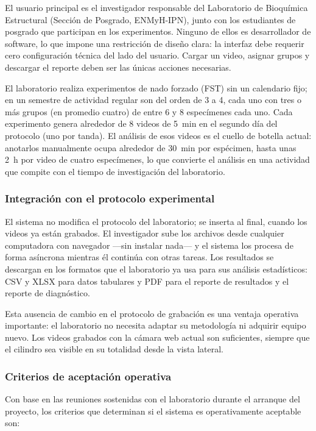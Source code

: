 El usuario principal es el investigador responsable del Laboratorio de Bioquímica Estructural (Sección de Posgrado, ENMyH-IPN), junto con los
estudiantes de posgrado que participan en los experimentos. Ninguno de ellos es
desarrollador de software, lo que impone una restricción de diseño clara: la interfaz
debe requerir cero configuración técnica del lado del usuario. Cargar un video,
asignar grupos y descargar el reporte deben ser las únicas acciones necesarias.

El laboratorio realiza experimentos de nado forzado (FST) sin un calendario fijo; en
un semestre de actividad regular son del orden de 3 a 4, cada uno con tres o más grupos (en promedio cuatro) de entre
6 y 8 especímenes cada uno. Cada experimento genera alrededor de 8 videos de 5~min en
el segundo día del protocolo (uno por tanda). El análisis de esos videos es el cuello de botella actual:
anotarlos manualmente ocupa alrededor de 30~min por espécimen, hasta unas 2~h por
video de cuatro especímenes, lo que convierte el análisis en
una actividad que compite con el tiempo de investigación del laboratorio.

\subsubsection{Integración con el protocolo experimental}

El sistema no modifica el protocolo del laboratorio; se inserta al final, cuando los
videos ya están grabados. El investigador sube los archivos desde cualquier computadora
con navegador ---sin instalar nada--- y el sistema los procesa de forma asíncrona
mientras él continúa con otras tareas. Los resultados se descargan en los formatos que
el laboratorio ya usa para sus análisis estadísticos: CSV y XLSX para datos tabulares
y PDF para el reporte de resultados y el reporte de diagnóstico.

Esta ausencia de cambio en el protocolo de grabación es una ventaja operativa
importante: el laboratorio no necesita adaptar su metodología ni adquirir equipo nuevo.
Los videos grabados con la cámara web actual son suficientes, siempre que el
cilindro sea visible en su totalidad desde la vista lateral.

\subsubsection{Criterios de aceptación operativa}

Con base en las reuniones sostenidas con el laboratorio durante el arranque del
proyecto, los criterios que determinan si el sistema es operativamente aceptable son:

